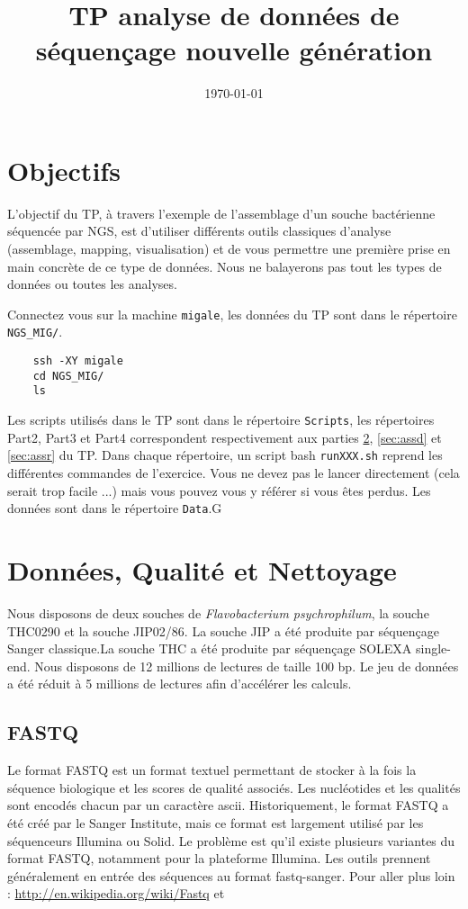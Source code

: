 \documentclass[a4paper,12pt]{article}
\title{TP analyse de données de séquençage nouvelle génération}
\date{\today}
\begin{document}
 

\maketitle 
\section{Objectifs} 
L'objectif du TP, à travers l'exemple de l'assemblage d'un souche bactérienne séquencée par NGS, est d'utiliser différents outils classiques d'analyse (assemblage, mapping, visualisation) et de vous permettre une première prise en main concrète de ce type de données. Nous ne balayerons pas tout les types de données ou toutes les analyses.

Connectez vous sur la machine \verb=migale=, les données du TP sont dans le répertoire \verb=NGS_MIG/=.
\begin{lstlisting}
	ssh -XY migale
	cd NGS_MIG/
	ls
\end{lstlisting}



Les scripts utilisés dans le TP sont dans le répertoire \verb=Scripts=, les répertoires Part2, Part3 et Part4 correspondent respectivement aux parties \ref{sec:qual}, \ref{sec:assd} et \ref{sec:assr} du TP. Dans chaque répertoire, un script bash \verb=runXXX.sh= reprend les différentes commandes de l'exercice. Vous ne devez pas le lancer directement (cela serait trop facile ...) mais vous pouvez vous y référer si vous êtes perdus. Les données sont dans le répertoire \verb=Data=.G


\section{Données, Qualité et Nettoyage}
\label{sec:qual}
Nous disposons de deux souches de \textit{Flavobacterium psychrophilum}, la souche THC0290 et la souche JIP02/86. La souche JIP a été produite par séquençage Sanger classique.La souche THC a été produite par séquençage SOLEXA single-end. Nous disposons de 12 millions de lectures de taille 100 bp. Le jeu de données a été réduit à 5 millions de lectures afin d'accélérer les calculs.

\subsection{FASTQ}
\label{sec:fastq}
Le format FASTQ est un format textuel permettant de stocker à la fois la séquence biologique et les scores de qualité associés. Les nucléotides et les qualités sont encodés chacun par un caractère ascii. Historiquement, le format FASTQ a été créé par le Sanger Institute, mais ce format est largement utilisé par les séquenceurs Illumina ou Solid. Le problème est qu'il existe plusieurs variantes du format FASTQ, notamment pour la plateforme Illumina. Les outils prennent généralement en entrée des séquences au format fastq-sanger.
Pour aller plus loin : \url{http://en.wikipedia.org/wiki/Fastq} et \cite{Cock:2009p1945} 
\end{document}
